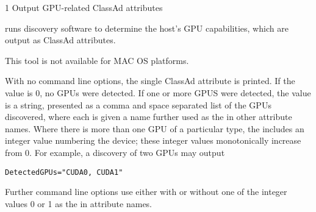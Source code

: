 \begin{ManPage}{\label{man-condor-gpu-discovery}}{1}
{Output GPU-related ClassAd attributes}

\Synopsis {}


\Description

 runs discovery software to determine
the host's GPU capabilities,
which are output as ClassAd attributes.

This tool is not available for MAC OS platforms.

With no command line options, the single ClassAd attribute
 is printed.
If the value is 0, no GPUs were detected.
If one or more GPUS were detected, the value is 
a string, presented as a comma and space separated list of the GPUs discovered,
where each is given a name further used as the  in other
attribute names.
Where there is more than one GPU of a particular type, 
the  includes an integer value numbering the device;
these integer values monotonically increase from 0. 
For example, a discovery of two GPUs may output
\begin{verbatim}
DetectedGPUs="CUDA0, CUDA1"
\end{verbatim}
Further command line options use  either with or without one of
the integer values 0 or 1 as the  in
attribute names.


\end{ManPage}
